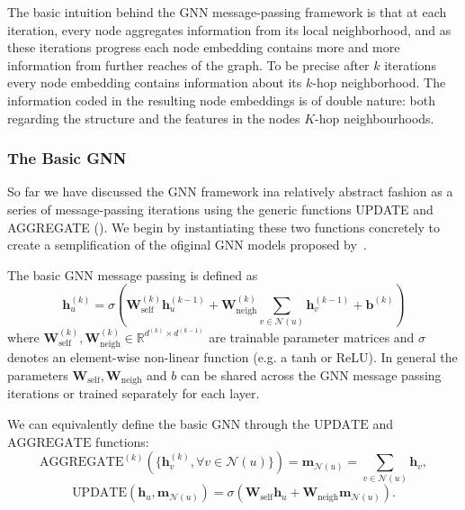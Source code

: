 The basic intuition behind the GNN message-passing framework is that at each iteration, every node aggregates information from its local neighborhood, and as these iterations progress each node embedding contains
more and more information from further reaches of the graph. To be precise after $k$ iterations every node embedding contains information about its $k$-hop neighborhood. 
The information coded in the resulting node embeddings is of double nature: both regarding the structure and the features in the nodes $K$-hop neighbourhoods.

\subsubsection{The Basic GNN}
So far we have discussed the GNN framework ina relatively abstract fashion as a series of message-passing iterations using the generic functions UPDATE and AGGREGATE (). We begin by instantiating these two functions concretely to create a semplification of the ofiginal GNN models proposed by~\cite{Merkwirth2005automaticGenerationComplementaryDescriptorsMolecularGraphNetworks}\cite{scarselli2008graphNeuralNetworkModel}.

The basic GNN message passing is defined as
\begin{equation*}
    \mathbf{h}_u^{(k)} = \sigma\left(\mathbf{W}_\text{self}^{(k)}\mathbf{h}_u^{(k-1)} + \mathbf{W}_\text{neigh}^{(k)}\sum_{v\in\mathcal{N}(u)}\mathbf{h}_v^{(k-1)} + \mathbf{b}^{(k)}\right)
\end{equation*}
where $\mathbf{W}_\text{self}^{(k)}, \mathbf{W}_\text{neigh}^{(k)} \in \mathbb{R}^{d^{(k)}\times d^{(k-1)}}$ are trainable parameter matrices and $\sigma$ denotes an element-wise non-linear function (e.g. a tanh or ReLU). In general the parameters $\mathbf{W}_\text{self}, \mathbf{W}_\text{neigh}$ and $b$ can be shared across the GNN message passing iterations or trained separately for each layer.


We can equivalently define the basic GNN through the $\text{UPDATE}$ and $\text{AGGREGATE}$ functions:
\begin{equation*}
    \text{AGGREGATE}^{(k)}(\{\mathbf{h}_v^{(k)}, \forall v \in \mathcal{N}(u)\}) =
    \mathbf{m}_{\mathcal{N}(u)} = \sum_{v\in\mathcal{N}(u)}\mathbf{h}_v,
\end{equation*}
\begin{equation*}
    \text{UPDATE}(\mathbf{h}_u, \mathbf{m}_{\mathcal{N}(u)}) = \sigma(\mathbf{W}_\text{self}\mathbf{h}_u + \mathbf{W}_\text{neigh}\mathbf{m}_{\mathcal{N}(u)}).
\end{equation*}

